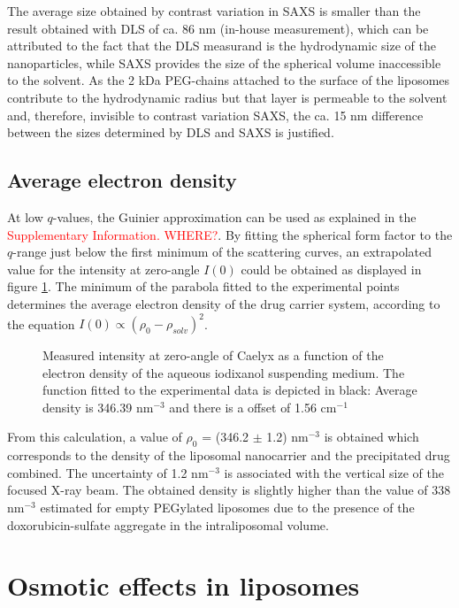 The average size obtained by contrast variation in SAXS is smaller than the result obtained with DLS of ca. 86 nm (in-house measurement), which can be attributed to the fact that the DLS measurand is the hydrodynamic size of the nanoparticles, while SAXS provides the size of the spherical volume inaccessible to the solvent. As the 2 kDa PEG-chains attached to the surface of the liposomes contribute to the hydrodynamic radius but that layer is permeable to the solvent and, therefore, invisible to contrast variation SAXS, the ca. 15 nm difference between the sizes determined by DLS and SAXS is justified. 

\subsection{Average electron density}
At low $q$-values, the Guinier approximation can be used as explained in the \textcolor{red}{Supplementary Information.  WHERE?}. By fitting the spherical form factor to the $q$-range just below the first minimum of the scattering curves, an extrapolated value for the intensity at zero-angle $I(0)$ could be obtained as displayed in figure \ref{fig:CaelyxAverageDensity}. The minimum of the parabola fitted to the experimental points determines the average electron density of the drug carrier system, according to the equation $I(0) \propto (\rho_0-\rho_{solv})^2$.

\begin{figure}
	\centering
		
		\caption{Measured intensity at zero-angle of Caelyx as a function of the electron density of the aqueous iodixanol suspending medium. The function fitted to the experimental data is depicted in black: Average density is 346.39 nm$^{-3}$ and there is a offset of 1.56 cm$^{-1}$}
		\label{fig:CaelyxAverageDensity}
\end{figure}

From this calculation, a value of $\rho_0$ = (346.2 $\pm$ 1.2) nm$^{-3}$ is obtained which corresponds to the density of the liposomal nanocarrier and the precipitated drug combined. The uncertainty of 1.2 nm$^{-3}$ is associated with the vertical size of the focused X-ray beam. The obtained density is slightly higher than the value of 338 nm$^{-3}$ estimated for empty PEGylated liposomes \cite{kucerka_structure_2006} due to the presence of the doxorubicin-sulfate aggregate in the intraliposomal volume.

\section{Osmotic effects in liposomes}

